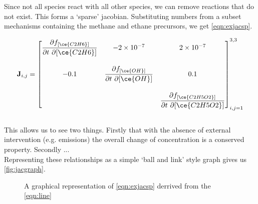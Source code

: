 Since not all species react with all other species, we can remove reactions that do not exist. This forms a `sparse' jacobian. Substituting numbers from a subset mechanisms containing the methane and ethane precursors, we get \autoref{eqn:exjacsp}.


   \begin{eqnarray}
    \mathbf{J}_{i,j} =
 \begin{bmatrix}
   \dfrac{\partial f_{[\ce{C2H6}]}}{\partial t \ \partial {[\ce{C2H6}]}} &
     - 2\times 10^{-7} &
     2\times 10^{-7} \\[20pt]
   -0.1 &
     \dfrac{\partial f_{[\ce{OH}]}}{\partial t \ \partial {[\ce{OH}]}} &
  0.1 \\[20pt]
   \  &
    \  &
     \dfrac{\partial f_{[\ce{C2H5O2}]}}{\partial t \ \partial {[\ce{C2H5O2}]}}
 \end{bmatrix}_{i,j=1}^{3,3}
 \label{eqn:exjacsp}
\end{eqnarray}\\


This allows us to see two things. Firstly that with the absence of external intervention (e.g. emissions) the overall change of concentration is a conserved property. Secondly ...\\

Representing these relationships as a simple `ball and link' style graph gives us \autoref{fig:jacgraph}.

 \begin{figure}[H]
 \begin{center}

 \end{center}

\caption{ A graphical representation of \autoref{eqn:exjacsp} derrived from the \autoref{eqn:line}}\label{fig:jacgraph}
 \end{figure}

